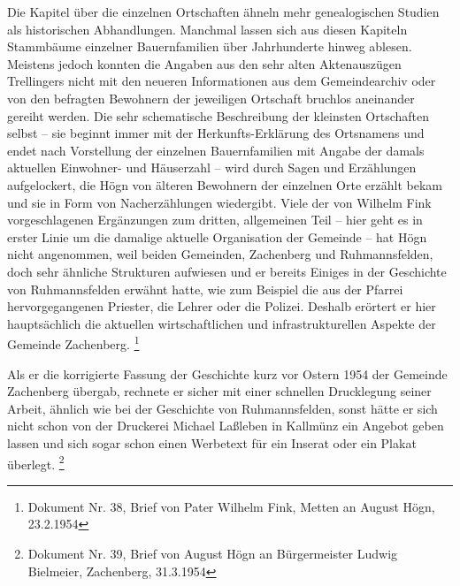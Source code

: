 \documentclass[a4paper]{article}
\begin{document}
Die Kapitel über die einzelnen Ortschaften ähneln mehr genealogischen
Studien als historischen Abhandlungen. Manchmal lassen sich aus diesen
Kapiteln Stammbäume einzelner Bauernfamilien über Jahrhunderte hinweg
ablesen. Meistens jedoch konnten die Angaben aus den sehr alten
Aktenauszügen Trellingers nicht mit den neueren Informationen aus dem
Gemeindearchiv oder von den befragten Bewohnern der jeweiligen
Ortschaft bruchlos aneinander gereiht werden. Die sehr schematische
Beschreibung der kleinsten Ortschaften selbst – sie beginnt immer mit
der Herkunfts-Erklärung des Ortsnamens und endet nach Vorstellung der
einzelnen Bauernfamilien mit Angabe der damals aktuellen Einwohner- und
Häuserzahl – wird durch Sagen und Erzählungen aufgelockert, die Högn
von älteren Bewohnern der einzelnen Orte erzählt bekam und sie in Form
von Nacherzählungen wiedergibt. Viele der von Wilhelm Fink
vorgeschlagenen Ergänzungen zum dritten, allgemeinen Teil – hier geht
es in erster Linie um die damalige aktuelle Organisation der Gemeinde –
hat Högn nicht angenommen, weil beiden Gemeinden, Zachenberg und
Ruhmannsfelden, doch sehr ähnliche Strukturen aufwiesen und er bereits
Einiges in der Geschichte von Ruhmannsfelden erwähnt hatte, wie zum
Beispiel die aus der Pfarrei hervorgegangenen Priester, die Lehrer oder
die Polizei. Deshalb erörtert er hier hauptsächlich die aktuellen
wirtschaftlichen und infrastrukturellen Aspekte der Gemeinde
Zachenberg. \footnote{Dokument Nr. 38, Brief von Pater Wilhelm Fink,
Metten an August Högn, 23.2.1954}

Als er die korrigierte Fassung der Geschichte kurz vor Ostern 1954 der
Gemeinde Zachenberg übergab, rechnete er sicher mit einer schnellen
Drucklegung seiner Arbeit, ähnlich wie bei der Geschichte von
Ruhmannsfelden, sonst hätte er sich nicht schon von der Druckerei
Michael Laßleben in Kallmünz ein Angebot geben lassen und sich sogar
schon einen Werbetext für ein Inserat oder ein Plakat
überlegt. \footnote{Dokument Nr. 39, Brief von August Högn an
Bürgermeister Ludwig Bielmeier, Zachenberg, 31.3.1954}
\end{document}
